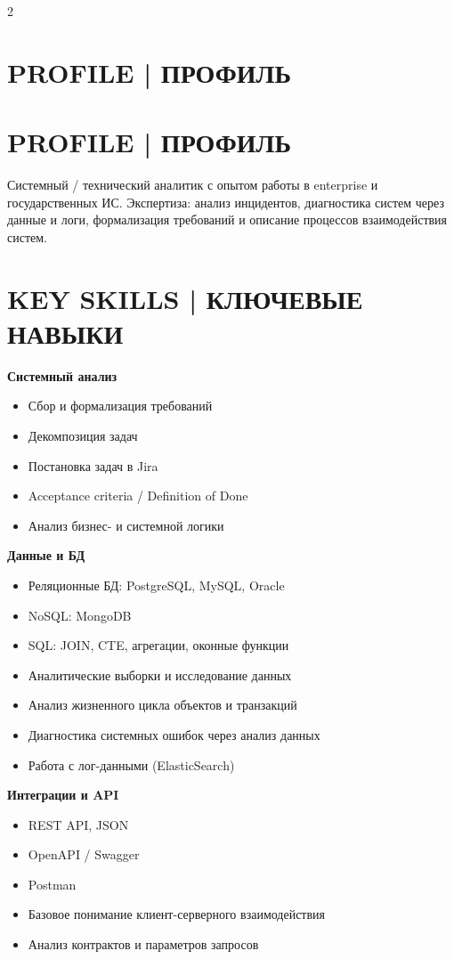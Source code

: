 \documentclass[9pt,a4paper]{article}
\begin{document}
\begin{paracol}{2}
\RaggedRight

\begin{tcolorbox}[
  breakable,
  colback=panel,
  colframe=panel,
  boxrule=0pt,
  arc=10pt,
  left=10pt,right=10pt,top=10pt,bottom=10pt
]

\section*{PROFILE | ПРОФИЛЬ}
\section*{PROFILE | ПРОФИЛЬ}
Системный / технический аналитик с опытом работы в enterprise и государственных ИС. 
Экспертиза: анализ инцидентов, диагностика систем через данные и логи, формализация требований 
и описание процессов взаимодействия систем.

\section*{KEY SKILLS | КЛЮЧЕВЫЕ НАВЫКИ}

\textbf{Системный анализ}
\begin{itemize}
  \item Сбор и формализация требований
  \item Декомпозиция задач
  \item Постановка задач в Jira
  \item Acceptance criteria / Definition of Done
  \item Анализ бизнес- и системной логики
\end{itemize}

\textbf{Данные и БД}
\begin{itemize}
  \item Реляционные БД: PostgreSQL, MySQL, Oracle
  \item NoSQL: MongoDB
  \item SQL: JOIN, CTE, агрегации, оконные функции
  \item Аналитические выборки и исследование данных
  \item Анализ жизненного цикла объектов и транзакций
  \item Диагностика системных ошибок через анализ данных
  \item Работа с лог-данными (ElasticSearch)
\end{itemize}

\textbf{Интеграции и API}
\begin{itemize}
  \item REST API, JSON
  \item OpenAPI / Swagger
  \item Postman
  \item Базовое понимание клиент-серверного взаимодействия
  \item Анализ контрактов и параметров запросов
\end{itemize}


\end{tcolorbox}
\end{paracol}
\end{document}
